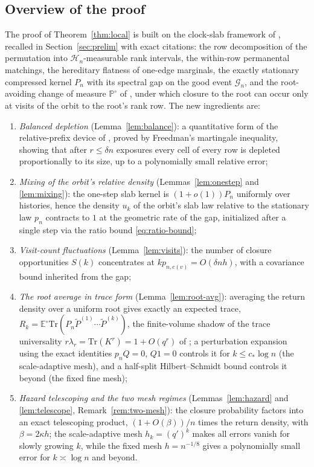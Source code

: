 \documentclass[11pt]{article}
\newcommand{\E}{\mathbb{E}}
\newcommand{\Prob}{\mathbb{P}}
\newcommand{\1}{\mathbf{1}}
\newcommand{\Tr}{\mathrm{Tr}}
\newcommand{\cG}{\mathcal{G}}
\newcommand{\cH}{\mathcal{H}}
\theoremstyle{remark}
\begin{document}
\subsection{Overview of the proof}
The proof of Theorem~\ref{thm:local} is built on the clock-slab
framework of \cite[Section~6]{Lon26}, recalled in
Section~\ref{sec:prelim} with exact citations: the row decomposition
of the permutation into $\cH_n$-measurable rank intervals, the
within-row permanental matchings, the hereditary flatness of one-edge
marginals, the exactly stationary compressed kernel $P_n$ with its
spectral gap on the good event $\cG_n$, and the root-avoiding change
of measure $\Prob^\circ$ of \cite[Lemma~6.9]{Lon26}, under which
closure to the root can occur only at visits of the orbit to the
root's rank row. The new ingredients are:
\begin{enumerate}[label=(\alph*)]
\item \emph{Balanced depletion} (Lemma~\ref{lem:balance}): a
quantitative form of the relative-prefix device of
\cite[Lemma~6.7]{Lon26}, proved by Freedman's martingale inequality,
showing that after $r\le\delta n$ exposures every cell of every row is
depleted proportionally to its size, up to a polynomially small
relative error;
\item \emph{Mixing of the orbit's relative density}
(Lemmas~\ref{lem:onestep} and \ref{lem:mixing}): the one-step slab
kernel is $(1+o(1))P_n$ uniformly over histories, hence the density
$u_k$ of the orbit's slab law relative to the stationary law $p_n$
contracts to $1$ at the geometric rate of the gap, initialized after a
single step via the ratio bound \eqref{eq:ratio-bound};
\item \emph{Visit-count fluctuations} (Lemma~\ref{lem:visits}): the
number of closure opportunities $S(k)$ concentrates at
$kp_{n,c(v)}=O(\delta nh)$, with a covariance bound inherited from the
gap;
\item \emph{The root average in trace form}
(Lemma~\ref{lem:root-avg}): averaging the return density over a
uniform root gives exactly an expected trace,
$R_k=\E^\circ\Tr(P_n\tilde P^{(1)}\cdots\tilde P^{(k)})$, the
finite-volume shadow of the trace universality
$r\lambda_r=\Tr(K^r)=1+O(q^r)$ of \cite[Theorem~5.19]{Lon26}; a
perturbation expansion using the exact identities $p_nQ=0$, $Q1=0$
controls it for $k\le c_*\log n$ (the scale-adaptive mesh), and a
half-split Hilbert--Schmidt bound controls it beyond (the fixed fine
mesh);
\item \emph{Hazard telescoping and the two mesh regimes}
(Lemmas~\ref{lem:hazard} and \ref{lem:telescope},
Remark~\ref{rem:two-mesh}): the closure probability factors into an
exact telescoping product, $(1+O(\beta))/n$ times the return density,
with $\beta=2\kappa h$; the scale-adaptive mesh $h_k=(q')^k$ makes all
errors vanish for slowly growing $k$, while the fixed mesh
$h=n^{-1/8}$ gives a polynomially small error for
$k\asymp\log n$ and beyond.
\end{enumerate}
\end{document}
